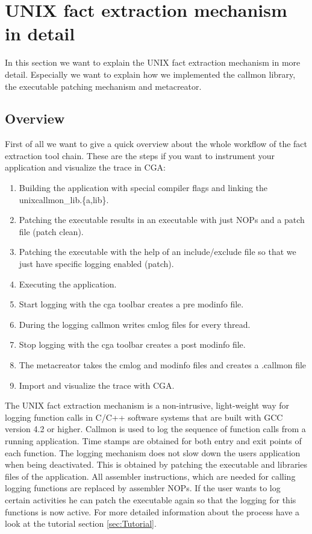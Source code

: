 
\section{UNIX fact extraction mechanism in detail}

In this section we want to explain the UNIX fact extraction mechanism in more detail. Especially we want to explain how we implemented the callmon library, the executable patching mechanism and metacreator.

\subsection{Overview}

First of all we want to give a quick overview about the whole workflow of the fact extraction tool chain. These are the steps if you want to instrument your application and visualize the trace in CGA:

\begin{enumerate}
	\item Building the application with special compiler flags and linking the unixcallmon\_lib.\{a,lib\}.
	\item Patching the executable results in an executable with just NOPs and a patch file (patch clean).
	\item Patching the executable with the help of an include/exclude file so that we just have specific logging enabled (patch).
	\item Executing the application.
	\item Start logging with the cga toolbar creates a pre modinfo file.
	\item During the logging callmon writes cmlog files for every thread.
	\item Stop logging with the cga toolbar creates a post modinfo file.
	\item The metacreator takes the cmlog and modinfo files and creates a .callmon file
	\item Import and visualize the trace with CGA.
\end{enumerate}

The UNIX fact extraction mechanism is a non-intrusive, light-weight way for logging function calls in C/C++ software systems that are built with GCC version 4.2 or higher. Callmon is used to log the sequence of function calls from a running application. Time stamps are obtained for both entry and exit points of each function. The logging mechanism does not slow down the users application when being deactivated. This is obtained by patching the executable and libraries files of the application. All assembler instructions, which are needed for calling logging functions are replaced by assembler NOPs. If the user wants to log certain activities he can patch the executable again so that the logging for this functions is now active. For more detailed information about the process have a look at the tutorial section \ref{sec:Tutorial}.

